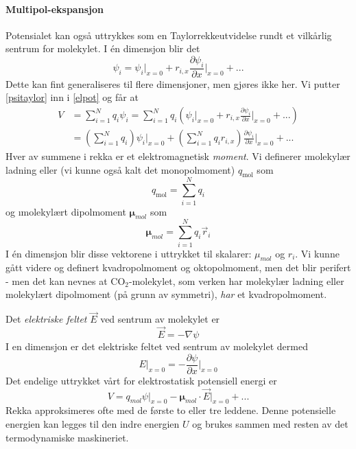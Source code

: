\paragraph{Multipol-ekspansjon} Potensialet kan også uttrykkes som en Taylorrekkeutvidelse rundt et vilkårlig sentrum for molekylet. I én dimensjon blir det
\begin{equation}
	\label{psitaylor}
	\psi_i=\psi_i\rvert_{x=0}+r_{i,x}\frac{\partial \psi_i}{\partial x}\rvert_{x=0}+...
\end{equation}
Dette kan fint generaliseres til flere dimensjoner, men gjøres ikke her. Vi putter \eqref{psitaylor} inn i \eqref{elpot} og får at
\begin{align}
	V&=\sum_{i=1}^Nq_i\psi_i=\sum_{i=1}^N q_i\left(\psi_i\rvert_{x=0}+r_{i,x}\frac{\partial \psi_i}{\partial x}\rvert_{x=0}+...\right) \\
	&=\left(\sum_{i=1}^Nq_i\right)\psi_i\rvert_{x=0}+\left(\sum_{i=1}^Nq_ir_{i,x}\right)\frac{\partial \psi_i}{\partial x}\rvert_{x=0}+...
\end{align}
Hver av summene i rekka er et elektromagnetisk \emph{moment}. Vi definerer \i{molekylær ladning} eller (vi kunne også kalt det monopolmoment) $q_{\text{mol}}$ som
\begin{equation}
	q_{\text{mol}}=\sum_{i=1}^N q_i
\end{equation}
og \i{molekylært dipolmoment} $\boldsymbol{\mu}_{mol}$ som
\begin{equation}
	\boldsymbol{\mu}_{mol} = \sum_{i=1}^N q_i\vec{r}_i
\end{equation}
I én dimensjon blir disse vektorene i uttrykket til skalarer: $\mu_{mol}$ og $r_i$. Vi kunne gått videre og definert kvadropolmoment og oktopolmoment, men det blir perifert - men det kan nevnes at CO$_2$-molekylet, som verken har molekylær ladning eller molekylært dipolmoment (på grunn av symmetri), \emph{har} et kvadropolmoment.

Det \emph{elektriske feltet}  $\vec{E}$ ved sentrum av molekylet er 
\begin{equation}
	\label{enabla}
	\vec{E}=-\nabla\psi
\end{equation}
I en dimensjon er det elektriske feltet ved sentrum av molekylet dermed
\begin{equation}
	E\rvert_{x=0}=-\frac{\partial \psi}{\partial x}\rvert_{x=0}
\end{equation}
Det endelige uttrykket vårt for elektrostatisk potensiell energi er
\begin{equation}
	V=q_{mol}\psi\rvert_{x=0}-\boldsymbol{\mu}_{mol}\cdot\vec{E}\rvert_{x=0}+...
\end{equation}
Rekka approksimeres ofte med de første to eller tre leddene. Denne potensielle energien kan legges til den indre energien $U$ og brukes sammen med resten av det termodynamiske maskineriet.

